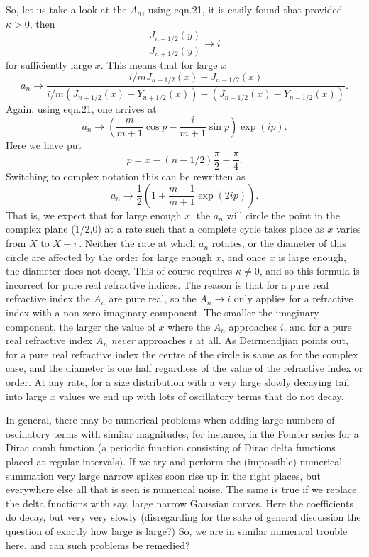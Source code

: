 So, let us take a look at the $A_n$, using  eqn.21, it is easily found that provided $\kappa>0$,
then
\begin{equation}
\frac{J_{n-1/2}(y)}{J_{n+1/2}(y)} \rightarrow i
\end{equation}
for sufficiently large $x$.
This means that for large $x$
\begin{equation}
a_n \rightarrow \frac{ i/m J_{n+1/2}(x)-J_{n-1/2}(x)}
                     { i/m (J_{n+1/2}(x)-Y_{n+1/2}(x) ) -(J_{n-1/2}(x)-Y_{n-1/2}(x) ) }.
\end{equation}
Again, using eqn.21, one arrives at
\begin{equation}
a_n \rightarrow  \left ( \frac{m}{m+1} \cos p -\frac{i}{m+1} \sin p \right) \exp(ip).
\end{equation}
Here we have put
\begin{equation}
p=x-(n-1/2) \frac{\pi}{2} -\frac{\pi}{4}.
\end{equation}
Switching to complex notation this can be rewritten as
\begin{equation}
a_n \rightarrow \frac{1}{2} \left ( 1+\frac{m-1}{m+1}  \exp(2 i p) \right ).
\end{equation}
That is, we expect that for large enough $x$, the $a_n$ will  circle the point in the complex
plane (1/2,0) at a rate such that  a complete cycle takes place as $x$ varies from $X$
 to $X+\pi$. Neither the rate at which $a_n$ rotates, or the diameter of this circle are affected by the order
for large enough $x$, and once $x$ is large enough, the diameter does not decay.
 This of course requires $\kappa \ne 0$, and so this formula is incorrect
for pure real refractive indices. The reason is that for a pure real refractive 
index the $A_n$ are pure real, so the  $A_n \rightarrow i$ only applies for
a refractive index with a non zero imaginary component. The smaller the imaginary component, the larger the value of $x$ where the $A_n$ approaches $i$, and for a pure real refractive index
 $A_n$ {\it never} approaches $i$ at all. As Deirmendjian points out, for a pure real
refractive index the centre of the circle is same as for the complex case, and the diameter is
 one half regardless of the value of the refractive index or order. 
At any rate, for a size distribution with a very large  slowly decaying tail into large $x$
values we end up with lots of oscillatory terms that do not decay.



In general,  there may be numerical problems when adding large numbers of oscillatory terms
 with similar magnitudes, for instance, in the Fourier series for a Dirac comb function (a
periodic function consisting of Dirac delta functions placed at regular intervals).
 If we try and perform the (impossible) numerical summation 
 very large narrow spikes soon rise up in the right places,
 but everywhere else all that is seen is numerical noise. The same is true if we replace the
delta functions with say, large narrow Gaussian curves. Here the coefficients do decay, but very very 
slowly (disregarding for the sake of general discussion the question of exactly how large is large?)
So, we are in similar numerical trouble here, 
 and  can such problems be remedied?

